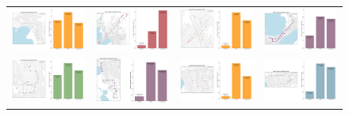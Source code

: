 \documentclass[b4paper]{article}
\begin{document}
\begin{figure}
\begin{center}
\begin{tabular}{ cccc }
  \includegraphics[width=44mm]{Route_22.png}  &   \includegraphics[width=44mm]{Route_23.png}  & \includegraphics[width=44mm]{Route_26.png}  & \includegraphics[width=44mm]{Route_27.png} \\ 

  \includegraphics[width=44mm]{Route_30.png}  &   \includegraphics[width=44mm]{Route_31.png}  & \includegraphics[width=44mm]{Route_32.png}  & \includegraphics[width=44mm]{Route_33.png} \\ 
  

\end{tabular}
\end{center}
\end{figure}
\end{document}
